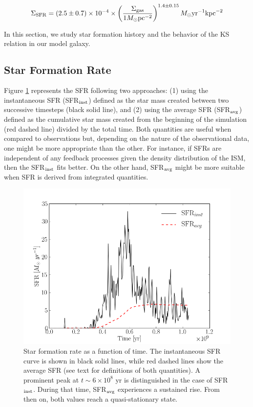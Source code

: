 \documentclass[twocolumn]{aastex}
\newcommand{\ssfr}{\Sigma_{\rm SFR}}
\newcommand{\msun}{M_\odot}
\newcommand{\sgas}{\Sigma_{\rm gas}}
\begin{document}
	\begin{equation}
	\ssfr = (2.5 \pm 0.7) \times 10^{-4} \times \left( \frac{\sgas}{1\msun \text{pc}^{-2}} \right)^{1.4 \pm 0.15} \msun \text{yr}^{-1} \text{kpc}^{-2}
	\label{eq:kslaw}
	\end{equation} 

In this section, we study star formation history and the behavior of the KS relation in our model galaxy.

\subsection{Star Formation Rate}
\label{subsec:SFR}

Figure \ref{fig:sfr} represents the SFR following two approaches: (1) using the instantaneous SFR (SFR$_{\rm inst}$) defined as the star mass created between two successive timesteps (black solid line), and (2) using the average SFR (SFR$_{\rm avg}$) defined as the cumulative star mass created from the beginning of the simulation (red dashed line) divided by the total time. Both quantities are useful when compared to observations but, depending on the nature of the observational data, one might be more appropriate than the other. For instance, if SFRs are independent of any feedback processes given the density distribution of the ISM, then the SFR$_{\rm inst}$ fits better. On the other hand, SFR$_{\rm avg}$ might be more suitable when SFR is derived from integrated quantities.

	\begin{figure}[h]
	\begin{center}
	\includegraphics[scale=0.5]{./f7.png}
	\caption{Star formation rate as a function of time. The instantaneous SFR curve is shown in black solid lines, while red dashed lines show the average SFR (see text for definitions of both quantities). A prominent peak at $t \sim 6 \times 10^8$ yr is distinguished in the case of SFR$_{\rm inst}$. During that time, SFR$_{\rm avg}$ experiences a sustained rise. From then on, both values reach a quasi-stationary state.}
	\label{fig:sfr}
	\end{center}
	\end{figure}
\end{document}
